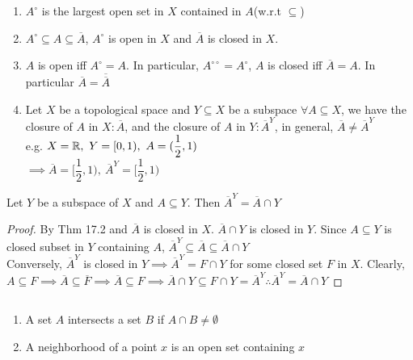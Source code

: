 \begin{rmk*}$ $
	\begin{enumerate}
		\item $A^{\circ}$ is the largest open set in $X$ contained in $A$(w.r.t $\subseteq$)
		\item $A^{\circ} \subseteq A \subseteq \overline{A}$, $A^{\circ}$ is open in $X$ and $\overline{A}$ is closed in $X$.
		\item $A$ is open iff $A^{\circ} = A$. In particular, $A^{\circ\circ} = A^{\circ}$, $A$ is closed iff $\overline{A} = A$. In particular $\overline{A} = \overline{\overline{A}}$
		\item Let $X$ be a topological space and $Y \subseteq X$ be a subspace $\forall A \subseteq X$, we have the closure of $A$ in $X: \overline{A}$, and the closure of $A$ in $Y: \overline{A}^Y$, in general, $\overline{A} \neq \overline{A}^Y$\\
		e.g. $X = \mathbb{R},~Y = [0,1),~A = (\dfrac{1}{2},1) $ \\ $\implies \overline{A} = [\dfrac{1}{2},1),~\overline{A}^Y = [\dfrac{1}{2},1)$
	\end{enumerate}
\end{rmk*}

\begin{thm*}
	Let $Y$ be a subspace of $X$ and $A \subseteq  Y$. Then $\overline{A}^Y = \overline{A}\cap Y$
\end{thm*}

\begin{proof}
	By Thm 17.2 and $\overline{A}$ is closed in $X$. $\overline{A} \cap Y$ is closed in $Y$. Since $A \subseteq Y$ is closed subset in $Y$ containing $A$, $\overline{A}^Y \subseteq \overline{A} \subseteq \overline{A} \cap Y$\\
	Conversely, $\overline{A}^Y$ is closed in $Y \implies \overline{A}^Y = F \cap Y$ for some closed set $F$ in $X$. Clearly, $A \subseteq F \implies \overline{A} \subseteq \overline{F} \implies \overline{A} \subseteq F \implies \overline{A} \cap Y \subseteq F \cap Y = \overline{A}^Y \therefore \overline{A}^Y = \overline{A} \cap Y$
\end{proof}

\begin{defn}$ $
	\begin{enumerate}
		\item A set $A$ intersects a set $B$ if $A \cap B \neq \emptyset$
		\item A neighborhood of a point $x$ is an open set containing $x$
	\end{enumerate}
\end{defn}

